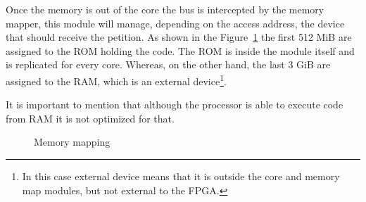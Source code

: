 Once the memory is out of the core the bus is intercepted by the memory mapper,
this module will manage, depending on the access address, the device that
should receive the petition. As shown in the Figure~\ref{fig:memory_map} the
first 512 MiB are assigned to the ROM holding the code. The ROM is inside the module itself
and is replicated for every core. Whereas, on the other hand, the last 3 GiB
are assigned to the RAM, which is an external device\footnote{In this case external 
device means that it is outside the core and memory map modules, but not external
to the FPGA.}.

It is important to mention that although the processor is able to execute code
from RAM it is not optimized for that.


\begin{figure}
  \centering

  \caption{Memory mapping}
  \label{fig:memory_map}

\end{figure}


